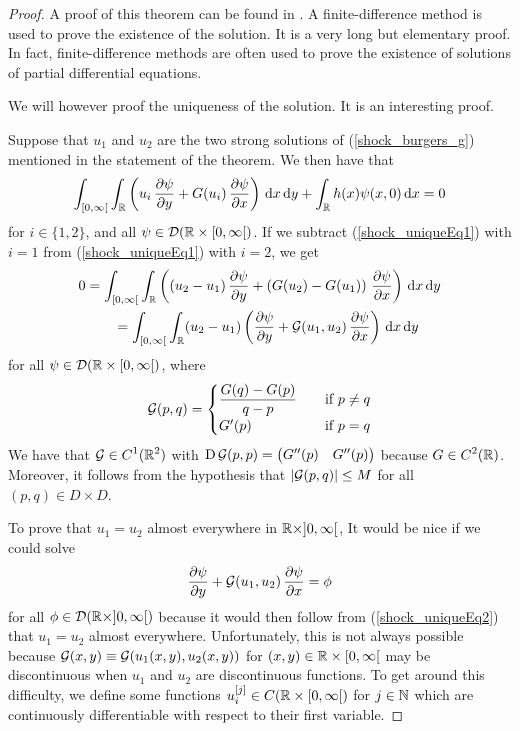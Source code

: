 \begin{proof}
A proof of this theorem can be found in \cite{Smo}.  A
finite-difference method is used to prove the existence of the solution.
It is a very long but elementary proof.  In fact, finite-difference
methods are often used to prove the existence of solutions of partial
differential equations.

We will however proof the uniqueness of the solution.  It is an
interesting proof.

Suppose that $u_1$ and $u_2$ are the two strong solutions of
(\ref{shock_burgers_g}) mentioned in the statement of the theorem.  We
then have that
\begin{equation} \label{shock_uniqueEq1}
\int_{[0,\infty[} \int_{\mathbb{R}}
\left(u_i\,\frac{\partial{\psi}}{\partial y} + G(u_i)\,\frac{\partial{\psi}}{\partial x} \right) \,\mathrm{d}{x}\,\mathrm{d}{y}
+ \int_{\mathbb{R}} h(x) \psi(x,0) \,\mathrm{d}{x} = 0
\end{equation}
for $i \in \{1,2\}$, and all $\psi \in \mathcal{D}(\mathbb{R}\times [0,\infty[)$.
If we subtract (\ref{shock_uniqueEq1}) with $i=1$
from (\ref{shock_uniqueEq1}) with $i=2$, we get
\begin{equation} \label{shock_uniqueEq2}
\begin{split}
0&= \int_{[0,\infty[} \int_{\mathbb{R}}
\left((u_2-u_1)\,\frac{\partial{\psi}}{\partial y} + \left(G(u_2)-G(u_1)\right)\,
\frac{\partial{\psi}}{\partial x} \right) \,\mathrm{d}{x}\,\mathrm{d}{y} \\
&\qquad =\int_{[0,\infty[} \int_{\mathbb{R}}
(u_2-u_1)\left( \frac{\partial{\psi}}{\partial y} + {\cal G}(u_1,u_2)\,\frac{\partial{\psi}}{\partial x} \right)
\,\mathrm{d}{x}\,\mathrm{d}{y}
\end{split}
\end{equation}
for all $\psi \in \mathcal{D}(\mathbb{R}\times [0,\infty[)$, where
\[
{\cal G}(p,q) =
\begin{cases}
\displaystyle \frac{G(q)-G(p)}{q-p} & \quad \text{if} \ p \neq q \\
G'(p) & \quad \text{if} \ p = q
\end{cases}
\]
We have that $\displaystyle {\cal G} \in C^1(\mathbb{R}^2)$ with
$\displaystyle \operatorname{D} {\cal G}(p,p) =
\begin{pmatrix} G''(p) & G''(p)\end{pmatrix}$ because
$\displaystyle G \in C^2(\mathbb{R})$.
Moreover, it follows from the hypothesis that
$|{\cal G}(p,q)| \leq M$ for all
$\displaystyle (p,q) \in D \times D$.

To prove that $u_1 = u_2$ almost everywhere in
$\mathbb{R}\times ]0,\infty[$,  It would be nice if we could solve 
\[
\frac{\partial{\psi}}{\partial y} + {\cal G}(u_1,u_2)\,\frac{\partial{\psi}}{\partial x} = \phi
\]
for all $\phi \in \mathcal{D}(\mathbb{R}\times ]0,\infty[)$ because it would
then follow from (\ref{shock_uniqueEq2}) that $u_1 = u_2$ almost
everywhere.  Unfortunately, this is not always possible because
${\cal G}(x,y) \equiv {\cal G}(u_1(x,y),u_2(x,y))$ for
$(x,y) \in \mathbb{R} \times [0,\infty[$ may be discontinuous when
$u_1$ and $u_2$ are discontinuous functions.  To get around
this difficulty, we define some functions
$\displaystyle u_i^{[j]}\in C(\mathbb{R}\times [0,\infty[)$ for
$j \in \mathbb{N}$ which are continuously differentiable with respect to
their first variable.


\end{proof}
